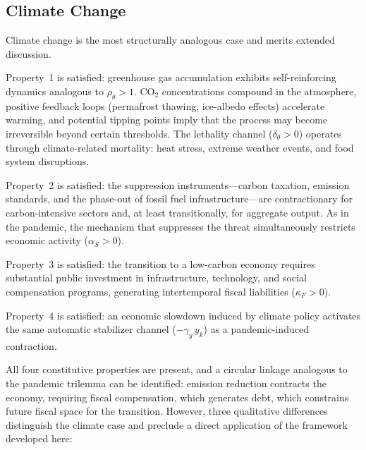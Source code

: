 \documentclass[12pt, a4paper]{article}
\begin{document}
\subsection*{Climate Change}

Climate change is the most structurally analogous case and merits extended discussion.

Property~1 is satisfied: greenhouse gas accumulation exhibits self-reinforcing dynamics analogous to $\rho_\theta > 1$. CO$_2$ concentrations compound in the atmosphere, positive feedback loops (permafrost thawing, ice-albedo effects) accelerate warming, and potential tipping points imply that the process may become irreversible beyond certain thresholds. The lethality channel ($\delta_\theta > 0$) operates through climate-related mortality: heat stress, extreme weather events, and food system disruptions.

Property~2 is satisfied: the suppression instruments---carbon taxation, emission standards, and the phase-out of fossil fuel infrastructure---are contractionary for carbon-intensive sectors and, at least transitionally, for aggregate output. As in the pandemic, the mechanism that suppresses the threat simultaneously restricts economic activity ($\alpha_S > 0$).

Property~3 is satisfied: the transition to a low-carbon economy requires substantial public investment in infrastructure, technology, and social compensation programs, generating intertemporal fiscal liabilities ($\kappa_F > 0$).

Property~4 is satisfied: an economic slowdown induced by climate policy activates the same automatic stabilizer channel ($-\gamma_y \, y_k$) as a pandemic-induced contraction.

All four constitutive properties are present, and a circular linkage analogous to the pandemic trilemma can be identified: emission reduction contracts the economy, requiring fiscal compensation, which generates debt, which constrains future fiscal space for the transition. However, three qualitative differences distinguish the climate case and preclude a direct application of the framework developed here:
\end{document}
